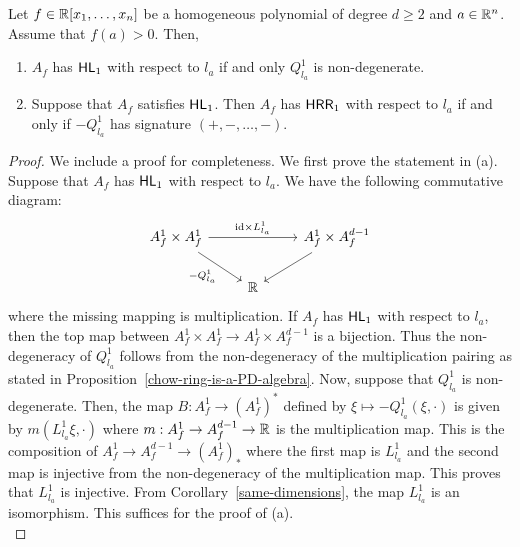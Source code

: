 \documentclass{puthesis-UG}
\begin{document}
\begin{prop}  \label{conditions-for-HL-HRR}
	Let $f \in \mathbb{R}[x_1, \ldots, x_n]$ be a homogeneous polynomial of degree $d \geq 2$ and $a \in \mathbb{R}^n$. Assume that $f(a) > 0$. Then, 
	\begin{enumerate}[label = (\alph*)]
		\item $A_f$ has $\mathsf{HL}_1$ with respect to $l_a$ if and only $Q_{l_a}^1$ is non-degenerate. 

		\item Suppose that $A_f$ satisfies $\mathsf{HL}_1$. Then $A_f$ has $\mathsf{HRR}_1$ with respect to $l_a$ if and only if $-Q_{l_a}^1$ has signature $(+, -, \ldots, -)$. 
	\end{enumerate}
\end{prop}

\begin{proof}
	We include a proof for completeness. We first prove the statement in (a). Suppose that $A_f$ has $\mathsf{HL}_1$ with respect to $l_a$. We have the following commutative diagram:
	\[\begin{tikzcd}
	{A_f^1 \times A_f^1} && {A_f^1 \times A_f^{d-1}} \\
	& {\mathbb{R}}
	\arrow["{\text{id} \times L_{l_a}^1}", from=1-1, to=1-3]
	\arrow["{-Q_{l_a}^1}"', from=1-1, to=2-2]
	\arrow[from=1-3, to=2-2]
\end{tikzcd}\]
where the missing mapping is multiplication. If $A_f$ has $\mathsf{HL}_1$ with respect to $l_a$, then the top map between $A_f^1 \times A_f^1 \to A_f^1 \times A_f^{d-1}$ is a bijection. Thus the non-degeneracy of $Q_{l_a}^1$ follows from the non-degeneracy of the multiplication pairing as stated in Proposition~\ref{chow-ring-is-a-PD-algebra}. Now, suppose that $Q_{l_a}^1$ is non-degenerate. Then, the map $B : A_f^1 \to (A_f^1)^*$ defined by $\xi \mapsto -Q_{l_a}^1(\xi, \cdot)$ is given by $m(L_{l_a}^1 \xi, \cdot)$ where $m : A_f^1 \to A_f^{d-1} \to \mathbb{R}$ is the multiplication map. This is the composition of $A_f^1 \to A_f^{d-1} \to (A_f^1)_*$ where the first map is $L_{l_a}^1$ and the second map is injective from the non-degeneracy of the multiplication map. This proves that $L_{l_a}^1$ is injective. From Corollary~\ref{same-dimensions}, the map $L_{l_a}^1$ is an isomorphism. This suffices for the proof of (a). \\


\end{proof}
\end{document}
